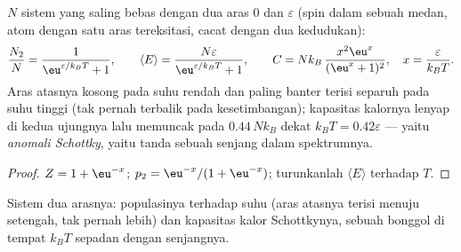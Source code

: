 \begin{proposition}\label{prop:b2:boltzmann-factor:twolevel}
$N$ sistem yang saling bebas dengan dua aras $0$ dan $\varepsilon$ (spin dalam sebuah
medan, atom dengan satu aras tereksitasi, cacat dengan dua kedudukan):
\[
\frac{N_2}{N} = \frac{1}{\eu^{\varepsilon/k_BT} + 1}, \qquad
\langle E\rangle = \frac{N\varepsilon}{\eu^{\varepsilon/k_BT} + 1}, \qquad
C = Nk_B\,\frac{x^2\eu^x}{(\eu^x + 1)^2}, \quad x = \frac{\varepsilon}{k_BT} .
\]
Aras atasnya kosong pada suhu rendah dan paling banter terisi separuh pada
suhu tinggi (tak pernah terbalik pada kesetimbangan); kapasitas kalornya
lenyap di kedua ujungnya lalu memuncak pada $0.44\,Nk_B$ dekat $k_BT = 0.42
\varepsilon$ --- yaitu \emph{anomali Schottky}, yaitu
tanda sebuah senjang dalam spektrumnya.
\end{proposition}

\begin{proof}
$Z = 1 + \eu^{-x}$; $p_2 = \eu^{-x}/(1 + \eu^{-x})$; turunkanlah $\langle
E\rangle$ terhadap $T$.
\end{proof}

\begin{omfigure}

{\small Sistem dua arasnya: populasinya terhadap suhu (aras
atasnya terisi menuju setengah, tak pernah lebih) dan kapasitas kalor
Schottkynya, sebuah bonggol di tempat $k_BT$ sepadan dengan senjangnya.}
\end{omfigure}

